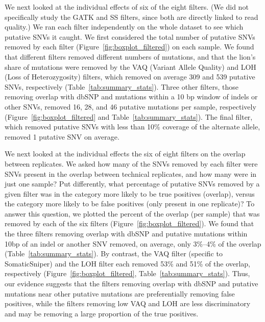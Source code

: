 \documentclass[11 pt]{article} %
\begin{document}
We next looked at the individual effects of six of the eight filters. (We did not specifically study the GATK and SS filters, since both are directly linked to read quality.) We ran each filter independently on the whole dataset to see which putative SNVs it caught. We first considered the total number of putative SNVs removed by each filter (Figure~\ref{fig:boxplot_filtered}) on each sample. We found that different filters removed different numbers of mutations, and that the lion's share of mutations were removed by the VAQ (Variant Allele Quality) and LOH (Loss of Heterozygosity) filters, which removed on average 309 and 539 putative SNVs, respectively (Table~\ref{tab:summary_stats}). Three other filters, those removing overlap with dbSNP and mutations within a 10 bp window of indels or other SNVs, removed 16, 28, and 46 putative mutations per sample, respectively (Figure~\ref{fig:boxplot_filtered} and Table~\ref{tab:summary_stats}). The final filter, which removed putative SNVs with less than 10\% coverage of the alternate allele, removed 1 putative SNV on average. 

We next looked at the individual effects the six of eight filters on the overlap between replicates. We asked how many of the SNVs removed by each filter were SNVs present in the overlap between technical replicates, and how many were in just one sample? Put differently, what percentage of putative SNVs removed by a given filter was in the category more likely to be true positives (overlap), versus the category more likely to be false positives (only present in one replicate)? To answer this question, we plotted the percent of the overlap (per sample) that was removed by each of the six filters (Figure~\ref{fig:boxplot_filtered}). We found that the three filters removing overlap with dbSNP and putative mutations within 10bp of an indel or another SNV removed, on average, only 3\%--4\% of the overlap (Table~\ref{tab:summary_stats}). By contrast, the VAQ filter (specific to SomaticSniper) and the LOH filter each removed 53\% and 51\% of the overlap, respectively (Figure~\ref{fig:boxplot_filtered}, Table~\ref{tab:summary_stats}). Thus, our evidence suggests that the filters removing overlap with dbSNP and putative mutations near other putative mutations are preferentially removing false positives, while the filters removing low VAQ and LOH are less discriminatory and may be removing a large proportion of the true positives. 
\end{document}
